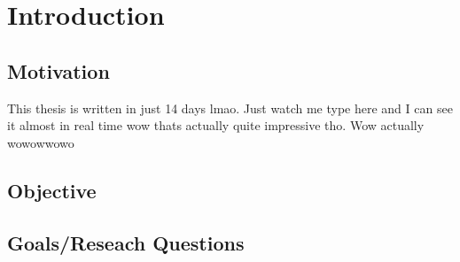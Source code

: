 \chapter{Introduction}

\section{Motivation}
This thesis is written in just 14 days lmao.
Just watch me type here and I can see it almost in real time wow thats actually quite impressive tho.
Wow actually wowowwowo
\section{Objective}
\section{Goals/Reseach Questions}
